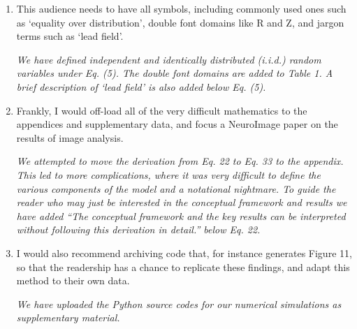 \documentclass{article}
\begin{document}
\begin{enumerate}
		\item This audience needs to have all symbols, including commonly used ones such as `equality over distribution', double font domains like R and Z, and jargon terms such as `lead field'.
			
		\emph{We have defined independent and identically distributed (i.i.d.) random variables under Eq. (5). The double font domains are added to Table 1. A brief description of `lead field' is also added below Eq. (5).}  
			
		\item Frankly, I would off-load all of the very difficult mathematics to the appendices and supplementary data, and focus a NeuroImage paper on the results of image analysis. 
			
			\emph{We attempted to move the derivation from Eq. 22 to Eq. 33 to the appendix. This led to more complications, where it was very difficult to define the various components of the model and a notational nightmare. To guide the reader who may just be interested in the conceptual framework and results we have added ``The conceptual framework and the key results can be interpreted without following this derivation in detail.'' below Eq. 22.}
			

			\item I would also recommend archiving code that, for instance generates Figure 11, so that the readership has a chance to replicate these findings, and adapt this method to their own data.
			
 			\emph{We have uploaded the Python source codes for our numerical simulations as supplementary material.}
 		
			                                       
			\end{enumerate}  
\end{document}
